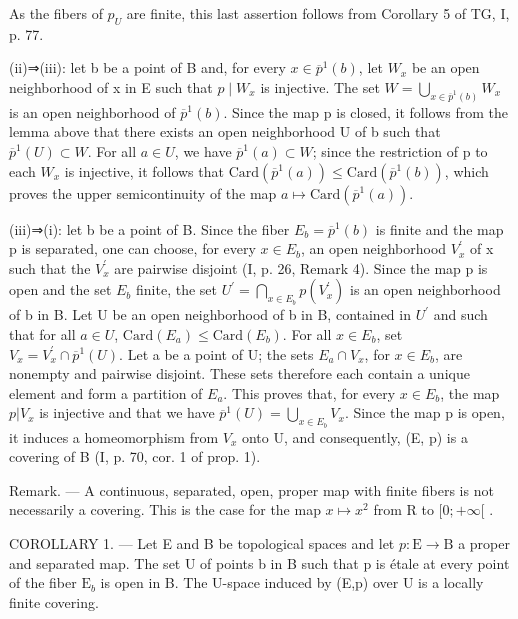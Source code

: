 As the fibers of \(p_{U}\) are finite, this last assertion follows from Corollary 5 of TG, I, p. 77.

(ii)⇒(iii): let b be a point of B and, for every \(x \in \overline{p}^{1}(b)\), let \(W_{x}\) be an open neighborhood of x in E such that \(p \mid W_{x}\) is injective. The set \(W = \bigcup_{x \in \overline{p}^{1}(b)} W_{x}\) is an open neighborhood of \(\overline{p}^{1}(b)\). Since the map p is closed, it follows from the lemma above that there exists an open neighborhood U of b such that \(\overline{p}^{1}(U) \subset W\). For all \(a \in U\), we have \(\overline{p}^{1}(a) \subset W\); since the restriction of p to each \(W_{x}\) is injective, it follows that \(\text{Card}(\overline{p}^{1}(a)) \leqslant \text{Card}(\overline{p}^{1}(b))\), which proves the upper semicontinuity of the map \(a \mapsto \text{Card}(\overline{p}^{1}(a))\).

(iii)⇒(i): let b be a point of B. Since the fiber \(E_{b} = \overline{p}^{1}(b)\) is finite and the map p is separated, one can choose, for every \(x \in E_{b}\), an open neighborhood \(V_{x}^{\prime}\) of x such that the \(V_{x}^{\prime}\) are pairwise disjoint (I, p. 26, Remark 4). Since the map p is open and the set \(E_{b}\) finite, the set \(U^{\prime} = \bigcap_{x \in E_{b}} p(V_{x}^{\prime})\) is an open neighborhood of b in B. Let U be an open neighborhood of b in B, contained in \(U^{\prime}\) and such that for all \(a \in U\), \(\text{Card}(E_{a}) \leqslant \text{Card}(E_{b})\). For all \(x \in E_{b}\), set \(V_{x} = V_{x}^{\prime} \cap \overline{p}^{1}(U)\). Let a be a point of U; the sets \(E_{a} \cap V_{x}\), for \(x \in E_{b}\), are nonempty and pairwise disjoint. These sets therefore each contain a unique element and form a partition of \(E_{a}\). This proves that, for every \(x \in E_{b}\), the map \(p | V_{x}\) is injective and that we have \(\overline{p}^{1}(U) = \bigcup_{x \in E_{b}} V_{x}\). Since the map p is open, it induces a homeomorphism from \(V_{x}\) onto U, and consequently, (E, p) is a covering of B (I, p. 70, cor. 1 of prop. 1).

Remark. --- A continuous, separated, open, proper map with finite fibers is not necessarily a covering. This is the case for the map \(x \mapsto x^{2}\) from R to \([0; +\infty[\) .

COROLLARY 1. --- Let E and B be topological spaces and let \(p\colon\mathrm{E}\to\mathrm{B}\) a proper and separated map. The set U of points b in B such that p is étale at every point of the fiber \(\mathrm{E}_{b}\) is open in B. The U-space induced by (E,p) over U is a locally finite covering.

